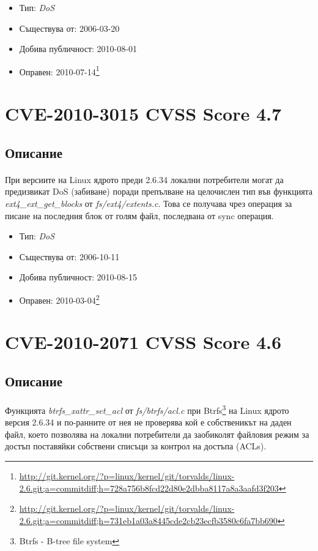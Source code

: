 \documentclass[a4paper,12pt,leqno]{article}
\begin{document}
\begin{itemize}
    \item Тип: \textit{DoS}
    \item Съществува от: 2006-03-20
  	\item Добива публичност: 2010-08-01
    \item Оправен: 2010-07-14\footnote{\url{http://git.kernel.org/?p=linux/kernel/git/torvalds/linux-2.6.git;a=commitdiff;h=728a756b8fcd22d80e2dbba8117a8a3aafd3f203}}
\end{itemize}

\section{CVE-2010-3015 CVSS Score 4.7}
\subsection{Описание}
\paragraph{}
При версиите на Linux ядрото преди 2.6.34 локални потребители могат да 
предизвикат DoS (забиване) поради препълване на целочислен тип във 
функцията \textit{ext4\_ext\_get\_blocks} от \textit{fs/ext4/extents.c}. Това се получава чрез 
операция за писане на последния блок от голям файл, последвана от sync 
операция.


\begin{itemize}
    \item Тип: \textit{DoS}
    \item Съществува от: 2006-10-11
  	\item Добива публичност: 2010-08-15
    \item Оправен: 2010-03-04\footnote{\url{http://git.kernel.org/?p=linux/kernel/git/torvalds/linux-2.6.git;a=commitdiff;h=731eb1a03a8445cde2cb23ecfb3580c6fa7bb690}}
\end{itemize}

\section{CVE-2010-2071 CVSS Score 4.6}
\subsection{Описание}
\paragraph{}
Функцията \textit{btrfs\_xattr\_set\_acl} от \textit{fs/btrfs/acl.c} при Btrfs\footnote{Btrfs - B-tree file system}
 на  Linux ядрото версия 
2.6.34 и по-ранните от нея не проверява кой е собственикът на даден файл, 
което позволява на локални потребители да заобиколят файловия режим за 
достъп поставяйки собствени списъци за контрол на достъпа (ACLs).
\end{document}

